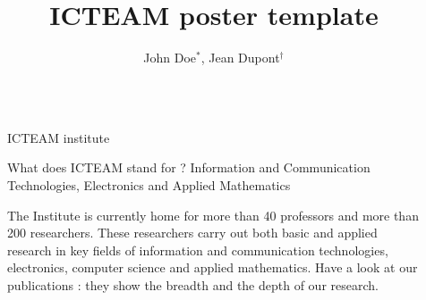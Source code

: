 \documentclass[final]{beamer}
\title{ICTEAM poster template}
\author{John Doe$^*$, Jean Dupont$^\dagger$}
\institute{$^*$ ICTEAM (UCLouvain), $^\dagger$ LIDS (MIT)}
\newlength{\sepwid}
\newlength{\onecolwid}
\begin{document}

\setlength{\belowcaptionskip}{2ex} %
\setlength\belowdisplayshortskip{2ex} %

\begin{frame}[t,fragile] %

\begin{columns}[t] %

\begin{column}{\sepwid}\end{column} %

\begin{column}{\onecolwid} %
  \begin{block}{ICTEAM institute}
  \begin{alertblock}{What does ICTEAM stand for ?}
    Information and Communication Technologies, Electronics and Applied Mathematics
  \end{alertblock}

  The Institute is currently home for more than 40 professors and more than 200 researchers. These researchers carry out both basic and applied research in key fields of information and communication technologies, electronics, computer science and applied mathematics. Have a look at our publications : they show the breadth and the depth of our research.

  \end{block}

\end{column}

\begin{column}{\sepwid}\end{column} %


\end{columns}
\end{frame}
\end{document}
